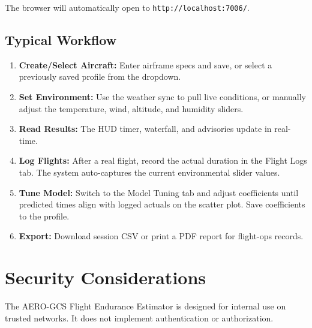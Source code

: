 \documentclass[11pt,a4paper]{article}
\begin{document}
The browser will automatically open to \texttt{http://localhost:7006/}.

\subsection{Typical Workflow}
\begin{enumerate}
    \item \textbf{Create/Select Aircraft:} Enter airframe specs and save, or select a previously saved profile from the dropdown.
    \item \textbf{Set Environment:} Use the weather sync to pull live conditions, or manually adjust the temperature, wind, altitude, and humidity sliders.
    \item \textbf{Read Results:} The HUD timer, waterfall, and advisories update in real-time.
    \item \textbf{Log Flights:} After a real flight, record the actual duration in the Flight Logs tab. The system auto-captures the current environmental slider values.
    \item \textbf{Tune Model:} Switch to the Model Tuning tab and adjust coefficients until predicted times align with logged actuals on the scatter plot. Save coefficients to the profile.
    \item \textbf{Export:} Download session CSV or print a PDF report for flight-ops records.
\end{enumerate}

\newpage

\section{Security Considerations}

\begin{alertbox}
    The AERO-GCS Flight Endurance Estimator is designed for internal use on trusted networks. It does not implement authentication or authorization.
\end{alertbox}
\end{document}
